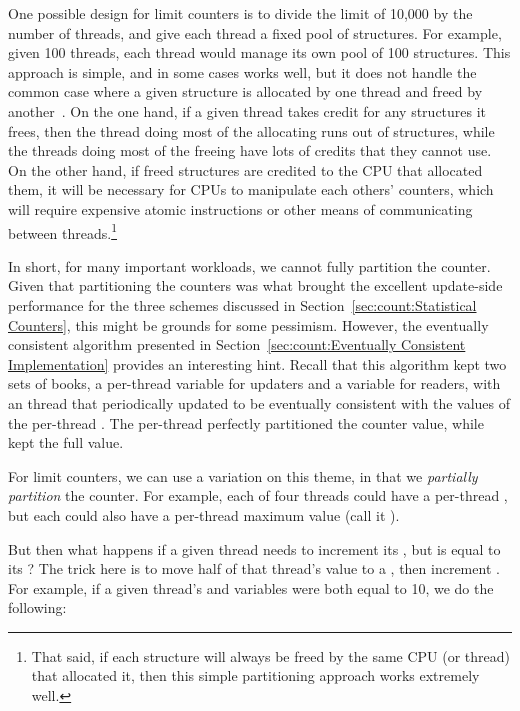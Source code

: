 One possible design for limit counters is to divide the limit of 10,000
by the number of threads, and give each thread a fixed pool of structures.
For example, given 100 threads, each thread would manage its own pool
of 100 structures.
This approach is simple, and in some cases works well, but it does not
handle the common case where a given structure is allocated by one
thread and freed by another~\cite{McKenney93}.
On the one hand, if a given thread takes credit for any structures it
frees, then the thread doing most of the allocating runs out
of structures, while the threads doing most of the freeing have lots
of credits that they cannot use.
On the other hand, if freed structures are credited to the CPU that
allocated them, it will be necessary for CPUs to manipulate each
others' counters, which will require expensive atomic instructions
or other means of communicating between threads.\footnote{
	That said, if each structure will always be freed
	by the same CPU (or thread) that allocated it, then
	this simple partitioning approach works extremely well.}

In short, for many important workloads, we cannot fully partition the counter.
Given that partitioning the counters was what brought the excellent
update-side performance for the three schemes discussed in
Section~\ref{sec:count:Statistical Counters}, this might be grounds
for some pessimism.
However, the eventually consistent algorithm presented in
Section~\ref{sec:count:Eventually Consistent Implementation}
provides an interesting hint.
Recall that this algorithm kept two sets of books, a
per-thread  variable for updaters and a 
variable for readers, with an  thread that periodically
updated  to be eventually consistent with the values
of the per-thread .
The per-thread  perfectly partitioned the counter value, while
 kept the full value.

For limit counters, we can use a variation on this theme, in that
we \emph{partially partition} the counter.
For example, each of four threads could have a per-thread
, but each could also have a per-thread maximum value
(call it ).

But then what happens if a given thread needs to increment its
, but  is equal to its ?
The trick here is to move half of that thread's  value
to a , then increment .
For example, if a given thread's  and 
variables were both equal to 10, we do the following:

